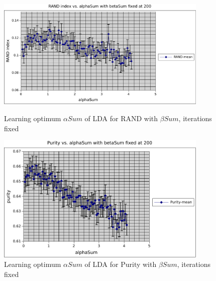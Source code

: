 \begin{figure}
    \centering
    \begin{minipage}{0.45\textwidth}
        \centering
        \includegraphics[width=0.9\textwidth]{fig/alphaSum_rand_lda.pdf}
        \caption{Learning optimum $\alpha Sum$ of LDA for RAND with $\beta Sum$, iterations fixed}
    \end{minipage}\hfill
    \begin{minipage}{0.45\textwidth}
        \centering
        \includegraphics[width=0.9\textwidth]{fig/alphaSum_purity_lda.pdf}
        \caption{Learning optimum $\alpha Sum$ of LDA for Purity with $\beta Sum$, iterations fixed}
    \end{minipage}
\end{figure}
